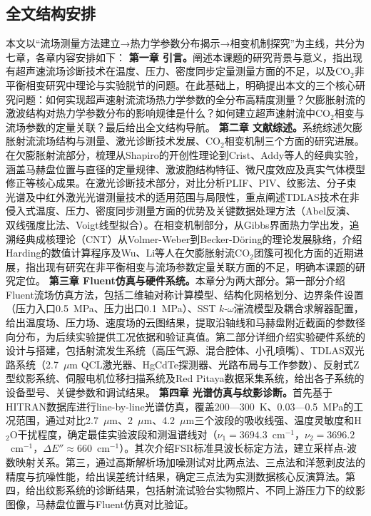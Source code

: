 	\subsection{全文结构安排}
	本文以“流场测量方法建立→热力学参数分布揭示→相变机制探究”为主线，共分为七章，各章内容安排如下：
	\textbf{第一章 引言。}阐述本课题的研究背景与意义，指出现有超声速流场诊断技术在温度、压力、密度同步定量测量方面的不足，以及CO$_2$非平衡相变研究中理论与实验脱节的问题。在此基础上，明确提出本文的三个核心研究问题：如何实现超声速射流流场热力学参数的全分布高精度测量？欠膨胀射流的激波结构对热力学参数分布的影响规律是什么？如何建立超声速射流中CO$_2$相变与流场参数的定量关联？最后给出全文结构导航。
	\textbf{第二章 文献综述。}系统综述欠膨胀射流流场结构与测量、激光诊断技术发展、CO$_2$相变机制三个方面的研究进展。在欠膨胀射流部分，梳理从Shapiro的开创性理论到Crist、Addy等人的经典实验，涵盖马赫盘位置与直径的定量规律、激波胞结构特征、微尺度效应及真实气体模型修正等核心成果。在激光诊断技术部分，对比分析PLIF、PIV、纹影法、分子束光谱及中红外激光光谱测量技术的适用范围与局限性，重点阐述TDLAS技术在非侵入式温度、压力、密度同步测量方面的优势及关键数据处理方法（Abel反演、双线强度比法、Voigt线型拟合）。在相变机制部分，从Gibbs界面热力学出发，追溯经典成核理论（CNT）从Volmer-Weber到Becker-Döring的理论发展脉络，介绍Harding的数值计算程序及Wu、Li等人在欠膨胀射流CO$_2$团簇可视化方面的近期进展，指出现有研究在非平衡相变与流场参数定量关联方面的不足，明确本课题的研究定位。
	\textbf{第三章 Fluent仿真与硬件系统。}本章分为两大部分。第一部分介绍Fluent流场仿真方法，包括二维轴对称计算模型、结构化网格划分、边界条件设置（压力入口0.5~MPa、压力出口0.1~MPa）、SST $k$-$\omega$湍流模型及耦合求解器配置，给出温度场、压力场、速度场的云图结果，提取沿轴线和马赫盘附近截面的参数径向分布，为后续实验提供工况依据和验证真值。第二部分详细介绍实验硬件系统的设计与搭建，包括射流发生系统（高压气源、混合腔体、小孔喷嘴）、TDLAS双光路系统（2.7~$\mu$m QCL激光器、HgCdTe探测器、光路布局与工作参数）、反射式Z型纹影系统、伺服电机位移扫描系统及Red Pitaya数据采集系统，给出各子系统的设备型号、关键参数和调试结果。
	\textbf{第四章 光谱仿真与纹影诊断。}首先基于HITRAN数据库进行line-by-line光谱仿真，覆盖200—300~K、0.03—0.5~MPa的工况范围，通过对比2.7~$\mu$m、2~$\mu$m、4.2~$\mu$m三个波段的吸收线强、温度灵敏度和H$_2$O干扰程度，确定最佳实验波段和测温谱线对（$\nu_1=3694.3$~cm$^{-1}$，$\nu_2=3696.2$~cm$^{-1}$，$\Delta E''\approx660$~cm$^{-1}$）。其次介绍FSR标准具波长标定方法，建立采样点-波数映射关系。第三，通过高斯解析场加噪测试对比两点法、三点法和洋葱剥皮法的精度与抗噪性能，给出误差统计结果，确定三点法为实测数据核心反演算法。第四，给出纹影系统的诊断结果，包括射流试验台实物照片、不同上游压力下的纹影图像，马赫盘位置与Fluent仿真对比验证。
